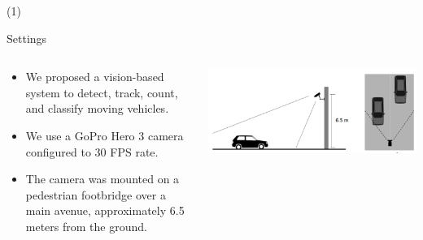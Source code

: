 
\begin{frame}{ (1)}
%

\begin{block}{Settings} 
\begin{columns}
\begin{column}{0.5\textwidth}
		\begin{itemize}
		\item We proposed a vision-based system to detect, track, count, and classify moving vehicles.
        \item We use a GoPro Hero 3 camera configured to 30 FPS rate. 
        \item The camera was mounted on a pedestrian footbridge over a main avenue, approximately 6.5 meters from the ground.
		\end{itemize}
\end{column}
\begin{column}{0.5\textwidth}  
    \begin{center}
\includegraphics[width=1.0\textwidth]{Figs/VideosCapturadosParaControlVehicular}
     \end{center}
\end{column}
\end{columns}
\end{block} 

\setcounter{footnote}{0}
\end{frame}

